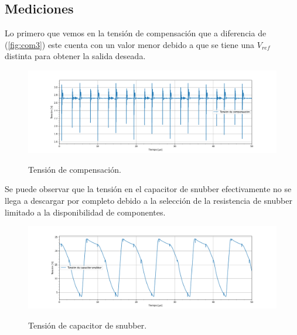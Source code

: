 \subsection{Mediciones}
Lo primero que vemos en la tensión de compensación que a diferencia de (\ref{fig:com3}) este cuenta con un valor menor debido a que se tiene una $V_{ref}$ distinta para obtener la salida deseada.
\begin{figure}[H]
	\centering
	\includegraphics[width=0.9\linewidth]{ImagenesParteIV/Vcom.png}
	\label{fig:vcom_4}
	\caption{Tensión de compensación.}
\end{figure}
Se puede observar que la tensión en el capacitor de snubber efectivamente no se llega a descargar por completo debido a la selección de la resistencia de snubber limitado a la disponibilidad de componentes.
\begin{figure}[H]
	\centering
	\includegraphics[width=0.9\linewidth]{ImagenesParteIV/Vcsnubber.png}
	\label{fig:vcsnubb_4}
	\caption{Tensión de capacitor de snubber.}
\end{figure}

